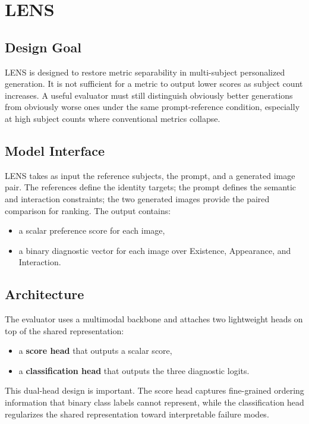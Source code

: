 \section{LENS}

\subsection{Design Goal}
LENS is designed to restore metric separability in multi-subject personalized generation. It is not sufficient for a metric to output lower scores as subject count increases. A useful evaluator must still distinguish obviously better generations from obviously worse ones under the same prompt-reference condition, especially at high subject counts where conventional metrics collapse.

\subsection{Model Interface}
LENS takes as input the reference subjects, the prompt, and a generated image pair. The references define the identity targets; the prompt defines the semantic and interaction constraints; the two generated images provide the paired comparison for ranking. The output contains:
\begin{itemize}
    \item a scalar preference score for each image,
    \item a binary diagnostic vector for each image over Existence, Appearance, and Interaction.
\end{itemize}

\subsection{Architecture}
The evaluator uses a multimodal backbone and attaches two lightweight heads on top of the shared representation:
\begin{itemize}
    \item a \textbf{score head} that outputs a scalar score,
    \item a \textbf{classification head} that outputs the three diagnostic logits.
\end{itemize}

This dual-head design is important. The score head captures fine-grained ordering information that binary class labels cannot represent, while the classification head regularizes the shared representation toward interpretable failure modes.

